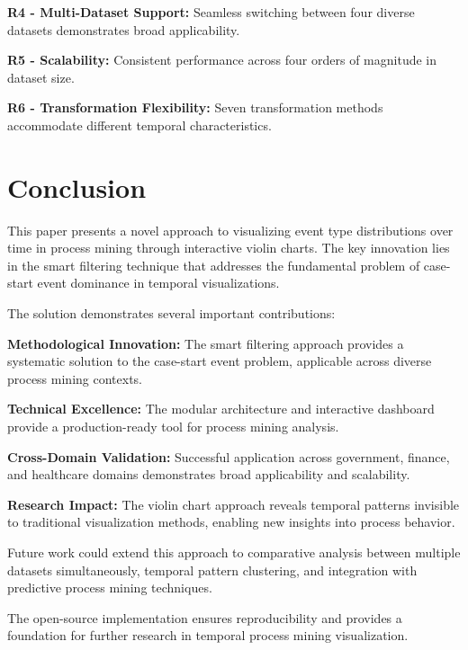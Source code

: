 \documentclass[11pt,a4paper]{article}
\begin{document}
\textbf{R4 - Multi-Dataset Support:} Seamless switching between four diverse datasets demonstrates broad applicability.

\textbf{R5 - Scalability:} Consistent performance across four orders of magnitude in dataset size.

\textbf{R6 - Transformation Flexibility:} Seven transformation methods accommodate different temporal characteristics.

\section{Conclusion}
\label{sec:conclusion}

This paper presents a novel approach to visualizing event type distributions over time in process mining through interactive violin charts. The key innovation lies in the smart filtering technique that addresses the fundamental problem of case-start event dominance in temporal visualizations.

The solution demonstrates several important contributions:

\textbf{Methodological Innovation:} The smart filtering approach provides a systematic solution to the case-start event problem, applicable across diverse process mining contexts.

\textbf{Technical Excellence:} The modular architecture and interactive dashboard provide a production-ready tool for process mining analysis.

\textbf{Cross-Domain Validation:} Successful application across government, finance, and healthcare domains demonstrates broad applicability and scalability.

\textbf{Research Impact:} The violin chart approach reveals temporal patterns invisible to traditional visualization methods, enabling new insights into process behavior.

Future work could extend this approach to comparative analysis between multiple datasets simultaneously, temporal pattern clustering, and integration with predictive process mining techniques.

The open-source implementation ensures reproducibility and provides a foundation for further research in temporal process mining visualization.



\end{document}
